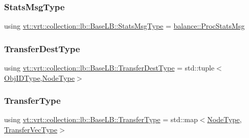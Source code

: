 \subsubsection{\texorpdfstring{Stats\+Msg\+Type}{StatsMsgType}}
{\footnotesize\ttfamily using \hyperlink{structvt_1_1vrt_1_1collection_1_1lb_1_1_base_l_b_acebfe78fa7dbafe6e9e5e5e514cda278}{vt\+::vrt\+::collection\+::lb\+::\+Base\+L\+B\+::\+Stats\+Msg\+Type} =  \hyperlink{structvt_1_1vrt_1_1collection_1_1balance_1_1_proc_stats_msg}{balance\+::\+Proc\+Stats\+Msg}}

\mbox{\label{structvt_1_1vrt_1_1collection_1_1lb_1_1_base_l_b_add886785f64ea725005f1263fd1393be}} 
\subsubsection{\texorpdfstring{Transfer\+Dest\+Type}{TransferDestType}}
{\footnotesize\ttfamily using \hyperlink{structvt_1_1vrt_1_1collection_1_1lb_1_1_base_l_b_add886785f64ea725005f1263fd1393be}{vt\+::vrt\+::collection\+::lb\+::\+Base\+L\+B\+::\+Transfer\+Dest\+Type} =  std\+::tuple$<$\hyperlink{structvt_1_1vrt_1_1collection_1_1lb_1_1_base_l_b_a15a2f756b59c8c2437985206b32aa403}{Obj\+I\+D\+Type},\hyperlink{namespacevt_a866da9d0efc19c0a1ce79e9e492f47e2}{Node\+Type}$>$}

\mbox{\label{structvt_1_1vrt_1_1collection_1_1lb_1_1_base_l_b_a0a5f834082d85c558bdaf84c464c1ead}} 
\subsubsection{\texorpdfstring{Transfer\+Type}{TransferType}}
{\footnotesize\ttfamily using \hyperlink{structvt_1_1vrt_1_1collection_1_1lb_1_1_base_l_b_a0a5f834082d85c558bdaf84c464c1ead}{vt\+::vrt\+::collection\+::lb\+::\+Base\+L\+B\+::\+Transfer\+Type} =  std\+::map$<$\hyperlink{namespacevt_a866da9d0efc19c0a1ce79e9e492f47e2}{Node\+Type}, \hyperlink{structvt_1_1vrt_1_1collection_1_1lb_1_1_base_l_b_a329e8179ec41a1bd4924c79fe23a79af}{Transfer\+Vec\+Type}$>$}

